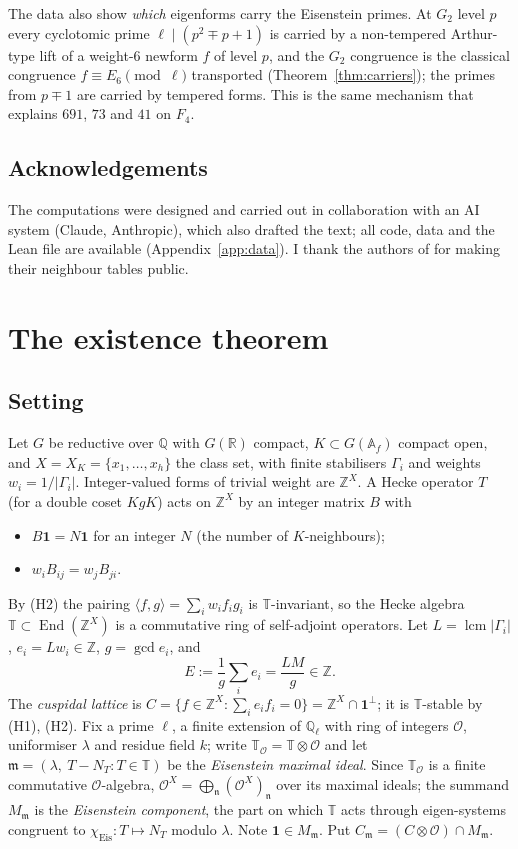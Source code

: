 \documentclass[11pt]{amsart}
\theoremstyle{definition}
\newcommand{\Z}{\mathbb{Z}}\newcommand{\Q}{\mathbb{Q}}\newcommand{\R}{\mathbb{R}}\newcommand{\A}{\mathbb{A}}\newcommand{\F}{\mathbb{F}}
\newcommand{\T}{\mathbb{T}}\newcommand{\Tr}{\operatorname{Tr}}\newcommand{\Aut}{\operatorname{Aut}}\newcommand{\Stab}{\operatorname{Stab}}
\newcommand{\Eis}{\mathrm{Eis}}\newcommand{\Gt}{G_2}\newcommand{\Ff}{F_4}
\begin{document}
The data also show \emph{which} eigenforms carry the Eisenstein primes. At $\Gt$ level $p$ every cyclotomic prime $\ell\mid(p^2\mp p+1)$ is carried by a non-tempered Arthur-type lift of a weight-$6$ newform $f$ of level $p$, and the $\Gt$ congruence is the classical congruence $f\equiv E_6\pmod\ell$ transported (Theorem~\ref{thm:carriers}); the primes from $p\mp1$ are carried by tempered forms. This is the same mechanism that explains $691$, $73$ and $41$ on $\Ff$.

\subsection*{Acknowledgements} The computations were designed and carried out in collaboration with an AI system (Claude, Anthropic), which also drafted the text; all code, data and the Lean file are available (Appendix~\ref{app:data}). I thank the authors of \cite{CL} for making their neighbour tables public.

\section{The existence theorem}\label{sec:thm}
\subsection{Setting} Let $G$ be reductive over $\Q$ with $G(\R)$ compact, $K\subset G(\A_f)$ compact open, and $X=X_K=\{x_1,\dots,x_h\}$ the class set, with finite stabilisers $\Gamma_i$ and weights $w_i=1/|\Gamma_i|$. Integer-valued forms of trivial weight are $\Z^X$. A Hecke operator $T$ (for a double coset $KgK$) acts on $\Z^X$ by an integer matrix $B$ with
\begin{itemize}
\item[(H1)] $B\mathbf 1=N\mathbf 1$ for an integer $N$ (the number of $K$-neighbours);
\item[(H2)] $w_iB_{ij}=w_jB_{ji}$.
\end{itemize}
By (H2) the pairing $\langle f,g\rangle=\sum_iw_if_ig_i$ is $\T$-invariant, so the Hecke algebra $\T\subset\operatorname{End}(\Z^X)$ is a commutative ring of self-adjoint operators. Let $L=\operatorname{lcm}|\Gamma_i|$, $e_i=Lw_i\in\Z$, $g=\gcd e_i$, and
\[E:=\frac1g\sum_ie_i=\frac{LM}{g}\in\Z.\]
The \emph{cuspidal lattice} is $C=\{f\in\Z^X:\sum_ie_if_i=0\}=\Z^X\cap\mathbf 1^\perp$; it is $\T$-stable by (H1), (H2). Fix a prime $\ell$, a finite extension of $\Q_\ell$ with ring of integers $\mathcal O$, uniformiser $\lambda$ and residue field $k$; write $\T_{\mathcal O}=\T\otimes\mathcal O$ and let $\mathfrak m=(\lambda,\ T-N_T:T\in\T)$ be the \emph{Eisenstein maximal ideal}. Since $\T_{\mathcal O}$ is a finite commutative $\mathcal O$-algebra, $\mathcal O^X=\bigoplus_{\mathfrak n}(\mathcal O^X)_{\mathfrak n}$ over its maximal ideals; the summand $M_{\mathfrak m}$ is the \emph{Eisenstein component}, the part on which $\T$ acts through eigen-systems congruent to $\chi_{\Eis}:T\mapsto N_T$ modulo $\lambda$. Note $\mathbf 1\in M_{\mathfrak m}$. Put $C_{\mathfrak m}=(C\otimes\mathcal O)\cap M_{\mathfrak m}$.
\end{document}
